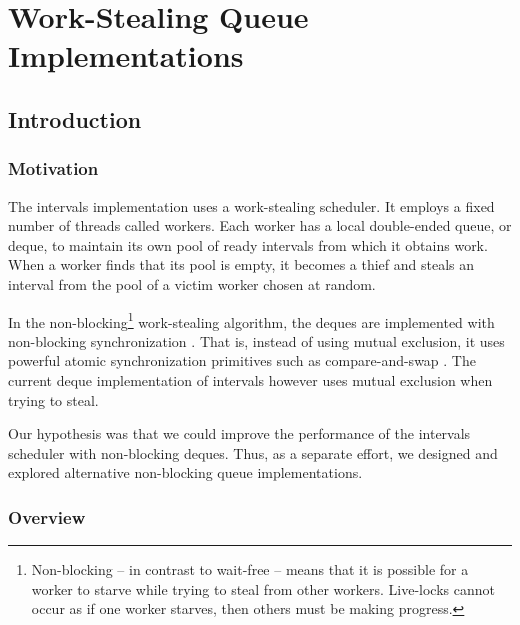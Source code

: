 
\part{Work-Stealing Queue Implementations}
\label{part:queues}

\chapter{Introduction}
\label{chap:queues-introduction}

\section{Motivation}
\label{sec:queues-intro-motivation}

The intervals implementation uses a work-stealing scheduler. It
employs a fixed number of threads called workers. Each worker has a
local double-ended queue, or deque, to maintain its own pool of ready
intervals from which it obtains work. When a worker finds that its
pool is empty, it becomes a thief and steals an interval from the pool
of a victim worker chosen at random.

In the non-blocking\footnote{Non-blocking -- in contrast to wait-free
  \cite{Herlihy1991} -- means that it is possible for a worker to
  starve while trying to steal from other workers. Live-locks cannot
  occur as if one worker starves, then others must be making
  progress.} work-stealing algorithm, the deques are implemented with
non-blocking synchronization \cite{Arora2001}. That is, instead of
using mutual exclusion, it uses powerful atomic synchronization
primitives such as compare-and-swap \cite{Moir1997}. The current deque
implementation of intervals however uses mutual exclusion when trying
to steal.

Our hypothesis was that we could improve the performance of the
intervals scheduler with non-blocking deques. Thus, as a separate
effort, we designed and explored alternative non-blocking queue
implementations.

\section{Overview}
\label{sec:queues-intro-overview}


